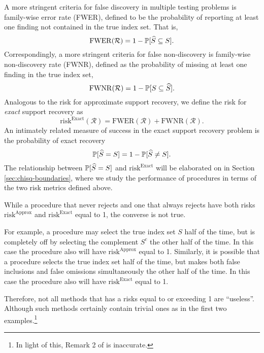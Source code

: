 A more stringent criteria for false discovery in multiple testing problems is family-wise error rate (FWER), defined to be the probability of reporting at least one finding not contained in the true index set.
That is,
\begin{equation} \label{eq:FWER}
    \mathrm{FWER}(\mathcal{R}) = 1 - \P[\widehat{S} \subseteq S].
\end{equation}
Correspondingly, a more stringent criteria for false non-discovery is family-wise non-discovery rate (FWNR), defined as the probability of missing at least one finding in the true index set,
\begin{equation} \label{eq:FWNDR}
    \mathrm{FWNR}(\mathcal{R}) = 1 - \P[S \subseteq \widehat{S}].
\end{equation}
Analogous to the risk for approximate support recovery, we define the risk for \emph{exact} support recovery as
\begin{equation} \label{eq:risk-exact}
    \mathrm{risk}^{\mathrm{Exact}}(\mathcal{R}) = \mathrm{FWER}(\mathcal{R}) + \mathrm{FWNR}(\mathcal{R}).
\end{equation}
An intimately related measure of success in the exact support recovery problem is the probability of exact recovery 
\begin{equation} \label{eq:risk-prob}
    \P[\widehat{S} = S] = 1 - \P[\widehat{S} \neq S].
\end{equation}
The relationship between $\P[\widehat{S} = S]$ and $\mathrm{risk}^{\mathrm{Exact}}$ will be elaborated on in Section \ref{sec:chisq-boundaries}, where we study the performance of procedures in terms of the two risk metrics defined above.
\begin{remark} \label{rmk:asymptotic-risks}
While a procedure that never rejects and one that always rejects have both risks $\mathrm{risk}^{\mathrm{Approx}}$ and $\mathrm{risk}^{\mathrm{Exact}}$ equal to 1, the converse is not true.

For example, a procedure may select the true index set $S$ half of the time, but is completely off by selecting the complement $S^c$ the other half of the time. In this case the procedure also will have $\mathrm{risk}^{\mathrm{Approx}}$ equal to 1.
Similarly, it is possible that a procedure selects the true index set half of the time, but makes both false inclusions and false omissions simultaneously the other half of the time. In this case the procedure also will have $\mathrm{risk}^{\mathrm{Exact}}$ equal to 1.
 
Therefore, not all methods that has a risks equal to or exceeding 1 are ``useless''.
Although such methods certainly contain trivial ones as in the first two examples.\footnote{In light of this, Remark 2 of \citet*{arias2017distribution} is inaccurate.}
\end{remark}

